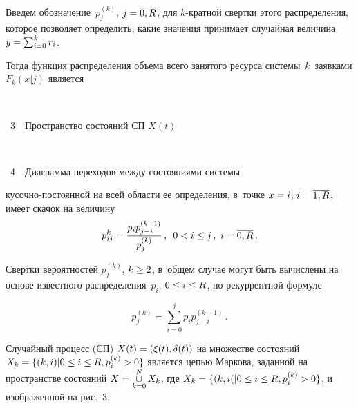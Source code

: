 \begin{multicols}{2}
  Введем обозначение~$p_j^{(k)}$, $j\hm= \overline{0,R}$, для $k$-крат\-ной 
свертки этого распределения, которое позволяет определить, какие значения 
принимает случайная величина  $y\hm= \sum\nolimits_{i=0}^k r_i$.

 Тогда 
функция распределения объема всего занятого ресурса системы~$k$~заявками 
$F_k(x\vert j)$ является\linebreak\vspace*{-12pt}
\begin{center}  %
\vspace*{-1pt}
\mbox{%
 \epsfxsize=78.119mm
 }
 

\vspace*{3pt}


{{\figurename~3}\ \ \small{Пространство состояний СП $X(t)$}}
\end{center}
 
 \vspace*{12pt}
 \begin{center}  %
\vspace*{-1pt}
\mbox{%
 \epsfxsize=77.584mm
 }
 
\end{center}


\noindent
{{\figurename~4}\ \ \small{Диаграмма переходов между состояниями системы}}
 
 \vspace*{12pt}


\noindent
 ку\-соч\-но-по\-сто\-ян\-ной на всей области ее 
определения, в~точке $x\hm=i$, $i\hm= \overline{1,R}$, имеет скачок на 
величину
  $$
  p_{ij}^k = \fr{p_i p_{j-i}^{(k-1)}}{p_j^{(k)}}\,,\enskip 0<i\leq j\,,\ 
i=\overline{0,R}\,.
  $$
  
  Свертки вероятностей $p_j^{(k)}$, $k\hm\geq 2$, в~общем случае могут быть 
вычислены на основе известного распределения~$p_i$, $0\hm\leq i\hm\leq R$, 
по рекуррентной формуле

\noindent
  \begin{equation}
  p_j^{(k)} = \sum\limits_{i=0}^j p_i p_{j-i}^{(k-1)}\,.
  \label{e1-v}
  \end{equation}
  
  Случайный процесс (СП) $X(t)\hm= (\xi(t),\delta(t))$ на множестве состояний 
$X_k\hm= \{ (k,i)\vert 0\hm\leq i\hm\leq R, p_i^{(k)}\hm>0\}$ является цепью 
Маркова, заданной на пространстве состояний $X\hm= \mathop{\cup}\limits_{k=0}^N 
X_k$, где $X_k\hm= \{ (k,i(\vert 0\hm\leq i \hm\leq R, p_i^{(k)}\hm>0\}$, и~
изображенной на рис.~3.
  

\end{multicols}
